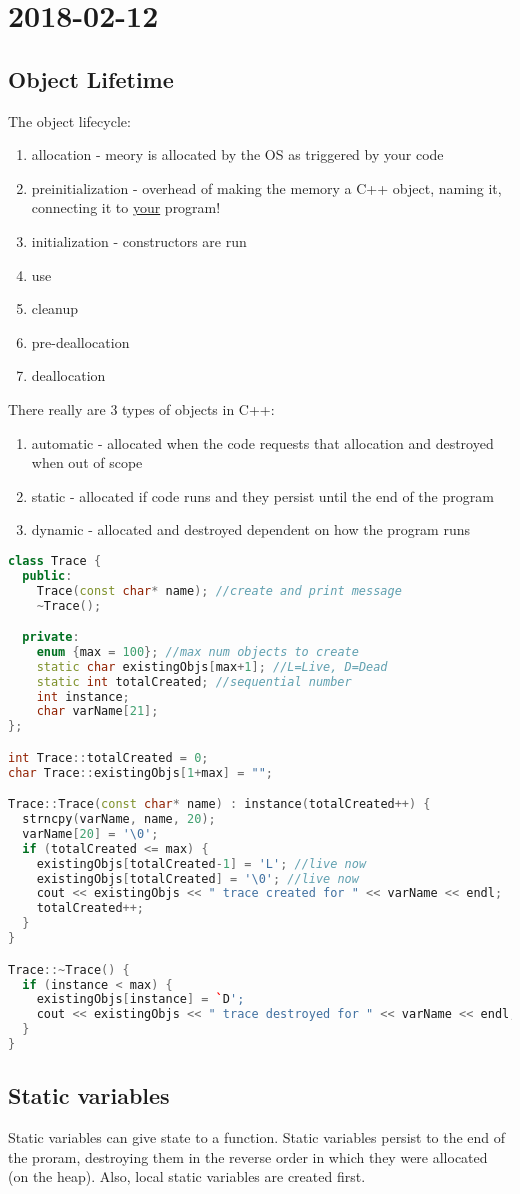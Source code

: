 \section{2018-02-12}

\subsection{Object Lifetime}

The object lifecycle:

\begin{enumerate}
  \item allocation - meory is allocated by the OS as triggered by your code
  \item preinitialization - overhead of making the memory a C++ object, naming it, connecting it to \underline{your} program!
  \item initialization - constructors are run
  \item use
  \item cleanup
  \item pre-deallocation
  \item deallocation
\end{enumerate}

There really are 3 types of objects in C++:

\begin{enumerate}
  \item automatic - allocated when the code requests that allocation and destroyed when out of scope
  \item static - allocated if code runs and they persist until the end of the program
  \item dynamic - allocated and destroyed dependent on how the program runs
\end{enumerate}

\begin{lstlisting}[language=C++]
class Trace {
  public:
    Trace(const char* name); //create and print message
    ~Trace();    

  private:
    enum {max = 100}; //max num objects to create
    static char existingObjs[max+1]; //L=Live, D=Dead
    static int totalCreated; //sequential number
    int instance;
    char varName[21];
};

int Trace::totalCreated = 0;
char Trace::existingObjs[1+max] = "";

Trace::Trace(const char* name) : instance(totalCreated++) {
  strncpy(varName, name, 20);
  varName[20] = '\0';
  if (totalCreated <= max) {
    existingObjs[totalCreated-1] = 'L'; //live now
    existingObjs[totalCreated] = '\0'; //live now
    cout << existingObjs << " trace created for " << varName << endl;
    totalCreated++;
  }
}

Trace::~Trace() {
  if (instance < max) {
    existingObjs[instance] = `D';
    cout << existingObjs << " trace destroyed for " << varName << endl;
  } 
}
\end{lstlisting}

\subsection{Static variables}

Static variables can give state to a function. Static variables persist to the end of the proram, destroying them in the reverse order in which they were allocated (on the heap). Also, local static variables are created first.